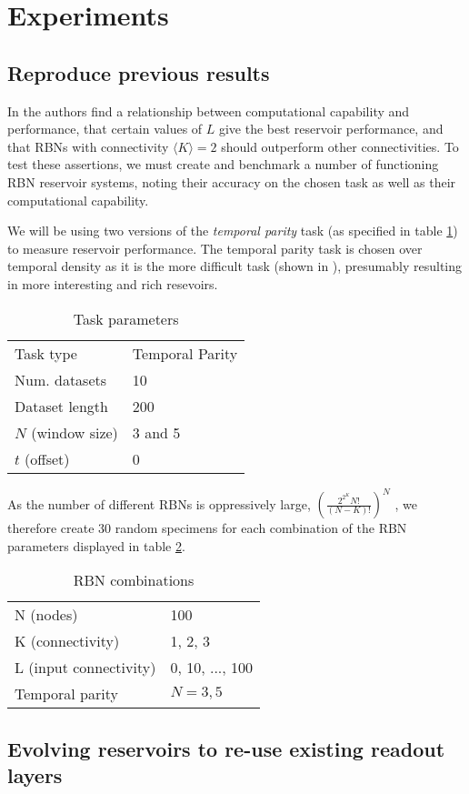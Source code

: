 \section{Experiments}

\subsection{Reproduce previous results}

In \cite{rbn-reservoir} the authors find a relationship between computational capability and performance,
that certain values of $L$ give the best reservoir performance,
and that RBNs with connectivity $\langle K \rangle =2$ should outperform other connectivities.
To test these assertions,
we must create and benchmark a number of functioning RBN reservoir systems,
noting their accuracy on the chosen task as well as their computational capability.

We will be using two versions of the \textit{temporal parity} task
(as specified in table \ref{table:task-parameters}) to measure reservoir performance.
The temporal parity task is chosen over temporal density as it is the more difficult task
(shown in \cite{rbn-reservoir}), presumably resulting in more interesting and rich resevoirs.

\begin{table}
  \centering
  \caption{Task parameters}
  \label{table:task-parameters}
  \begin{tabular}{ll}
    Task type         & Temporal Parity \\
    Num. datasets     & 10              \\
    Dataset length    & 200             \\
    $N$ (window size) & 3 and 5         \\
    $t$ (offset)      & 0               \\
  \end{tabular}
\end{table}


As the number of different RBNs is oppressively large,
$(\frac{2^{2^{K}}N!}{(N-K)!})^N$ \cite{gershenson2004introduction},
we therefore create 30 random specimens for each combination of the RBN parameters displayed in table \ref{table:rbn-combinations}.

\begin{table}
  \centering
  \caption{RBN combinations}
  \label{table:rbn-combinations}
  \begin{tabular}{ll}
    N (nodes)              & 100             \\
    K (connectivity)       & 1, 2, 3         \\
    L (input connectivity) & 0, 10, ..., 100 \\
    Temporal parity        & $N=3,5$ \\
  \end{tabular}
\end{table}

\subsection{Evolving reservoirs to re-use existing readout layers}
